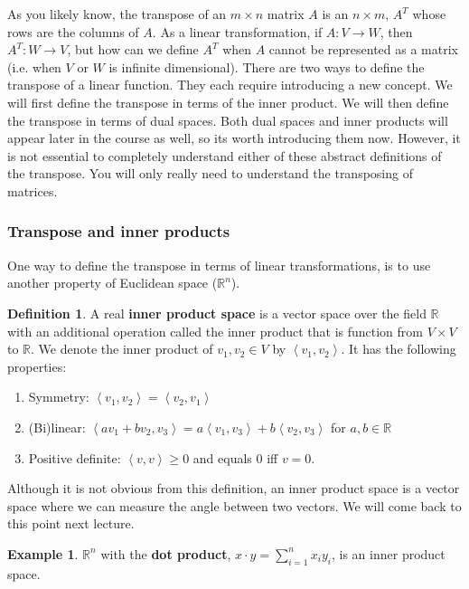 \documentclass[12pt,reqno]{amsart}
\def\R{\mathbb{R}}
\newcommand{\iprod}[2]{\left\langle {#1} , {#2} \right\rangle}
\theoremstyle{definition}
\newtheorem{definition}{Definition}[section]
\newtheorem{example}{Example}[section]
\begin{document}
As you likely know, the transpose of an $m \times n$ matrix $A$ is an
$n \times m$, $A^T$ whose rows are the columns of $A$. As a linear
transformation, if $A: V \to W$, then $A^T: W \to V$, but how can we
define $A^T$ when $A$ cannot be represented as a matrix (i.e. when $V$
or $W$ is infinite dimensional). There are two ways to define the
transpose of a linear function. They each require introducing a new
concept. We will first define the transpose in terms of the inner
product. We will then define the transpose in terms of dual
spaces. Both dual spaces and inner products will appear later in the
course as well, so its worth introducing them now. However, it is not
essential to completely understand either of these abstract
definitions of the transpose. You will only really need to understand
the transposing of matrices.

\subsubsection{Transpose and inner products}

One way to define the transpose in terms of linear
transformations, is to use another property of Euclidean
space ($\R^n$). 
\begin{definition}
  A real \textbf{inner product space} is a vector space over the field
  $\R$ with an additional operation called the inner product that is
  function from $V \times V$ to $\mathbb{R}$. We denote the inner
  product of $v_1, v_2 \in V$ by $\iprod{v_1}{v_2}$. It has the
  following properties:
  \begin{enumerate}
  \item Symmetry: $\iprod{v_1}{v_2} = \iprod{v_2}{v_1}$
  \item (Bi)linear: $\iprod{a v_1 + b v_2}{v_3} = a \iprod{v_1}{v_3} + b
    \iprod{v_2}{v_3}$ for $a, b \in \R$
  \item Positive definite: $\iprod{v}{v} \geq 0$ and equals $0$ iff
    $v=0$. 
  \end{enumerate}  
\end{definition}
Although it is not obvious from this definition, an inner product
space is a vector space where we can measure the angle between two
vectors. We will come back to this point next lecture.
\begin{example}
  $\R^n$ with the \textbf{dot product}, $x \cdot y = \sum_{i=1}^n x_i
  y_i$, is an inner product space. 
\end{example}
\end{document}
